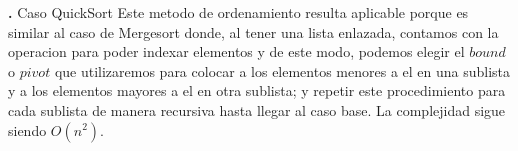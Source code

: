 \documentclass[10pt,a4paper]{article}
\begin{document}
\newline
\newline
\textbf{.} Caso QuickSort
\newline
\newline
Este metodo de ordenamiento resulta aplicable porque es similar al caso de Mergesort donde, al tener una lista enlazada, contamos con la operacion para poder indexar elementos y de este modo, podemos elegir el $bound$ o $pivot$ que utilizaremos para colocar a los elementos menores a el en una sublista y a los elementos mayores a el en otra sublista; y repetir este procedimiento para cada sublista de manera recursiva hasta llegar al caso base. La complejidad sigue siendo $O(n^{2})$. 
\end{document}
